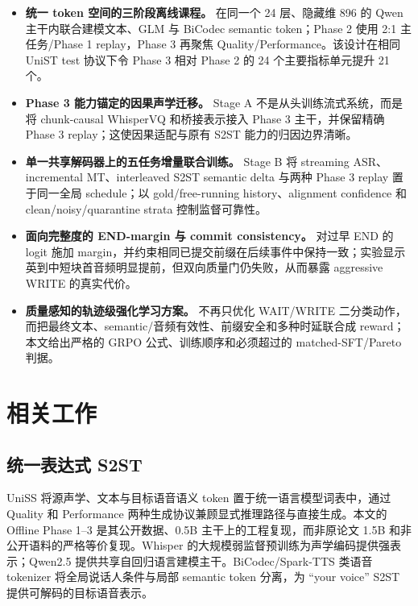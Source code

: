\documentclass[11pt,a4paper]{article}
\begin{document}
\begin{itemize}
  \item \textbf{统一 token 空间的三阶段离线课程。} 在同一个 24 层、隐藏维 896 的 Qwen 主干内联合建模文本、GLM 与 BiCodec semantic token；Phase 2 使用 2:1 主任务/Phase 1 replay，Phase 3 再聚焦 Quality/Performance。该设计在相同 UniST test 协议下令 Phase 3 相对 Phase 2 的 24 个主要指标单元提升 21 个。
  \item \textbf{Phase 3 能力锚定的因果声学迁移。} Stage A 不是从头训练流式系统，而是将 chunk-causal WhisperVQ 和桥接表示接入 Phase 3 主干，并保留精确 Phase 3 replay；这使因果适配与原有 S2ST 能力的归因边界清晰。
  \item \textbf{单一共享解码器上的五任务增量联合训练。} Stage B 将 streaming ASR、incremental MT、interleaved S2ST semantic delta 与两种 Phase 3 replay 置于同一全局 schedule；以 gold/free-running history、alignment confidence 和 clean/noisy/quarantine strata 控制监督可靠性。
  \item \textbf{面向完整度的 END-margin 与 commit consistency。} 对过早 END 的 logit 施加 margin，并约束相同已提交前缀在后续事件中保持一致；实验显示英到中短块首音频明显提前，但双向质量门仍失败，从而暴露 aggressive WRITE 的真实代价。
  \item \textbf{质量感知的轨迹级强化学习方案。} 不再只优化 WAIT/WRITE 二分类动作，而把最终文本、semantic/音频有效性、前缀安全和多种时延联合成 reward；本文给出严格的 GRPO 公式、训练顺序和必须超过的 matched-SFT/Pareto 判据。
\end{itemize}

\section{相关工作}

\subsection{统一表达式 S2ST}

UniSS 将源声学、文本与目标语音语义 token 置于统一语言模型词表中，通过 Quality 和 Performance 两种生成协议兼顾显式推理路径与直接生成\cite{cheng2025uniss}。本文的 Offline Phase 1--3 是其公开数据、0.5B 主干上的工程复现，而非原论文 1.5B 和非公开语料的严格等价复现。Whisper 的大规模弱监督预训练为声学编码提供强表示\cite{radford2022whisper}；Qwen2.5 提供共享自回归语言建模主干\cite{yang2024qwen25}。BiCodec/Spark-TTS 类语音 tokenizer 将全局说话人条件与局部 semantic token 分离，为 ``your voice'' S2ST 提供可解码的目标语音表示\cite{wang2025sparktts}。
\end{document}
